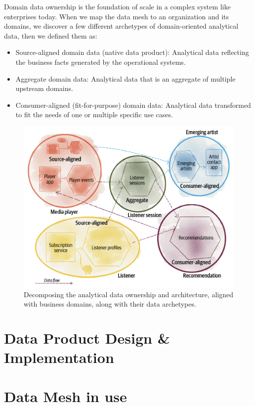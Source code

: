 \documentclass[12pt, a4paper]{book}
\begin{document}
Domain data ownership is the foundation of scale in a complex system like enterprises today. When we map the data mesh to an organization and its domains, we discover a few different archetypes of domain-oriented analytical data, then we defined them as:
	\begin{itemize}
		\item Source-aligned domain data (native data product): Analytical data reflecting the business facts generated by the operational systems.
		\item Aggregate domain data: Analytical data that is an aggregate of multiple upstream domains.
		\item Consumer-aligned (fit-for-purpose) domain data: Analytical data transformed to fit the needs of one or multiple specific use cases.
	\end{itemize}

\begin{figure}[h]
	\centering
	\includegraphics[width=14cm]{DecomposeData.png}
	\caption{Decomposing the analytical data ownership and architecture, aligned with business domains, along with their data archetypes.}
	\label{DecomposeData}
\end{figure}

\chapter{Data Product Design \& Implementation}

\chapter{Data Mesh in use}
\end{document}
